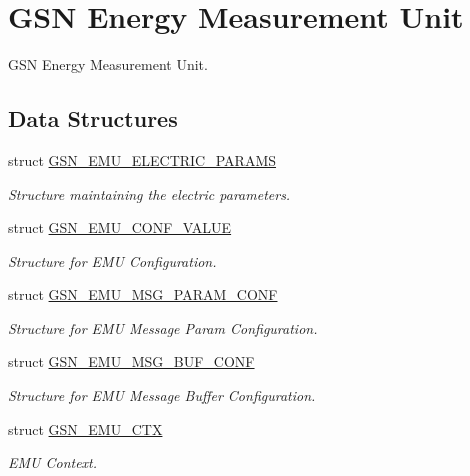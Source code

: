\hypertarget{a00663}{
\section{GSN Energy Measurement Unit}
\label{a00663}
}


GSN Energy Measurement Unit.  


\subsection*{Data Structures}
\begin{DoxyCompactItemize}
\item 
struct \hyperlink{a00060}{GSN\_\-EMU\_\-ELECTRIC\_\-PARAMS}
\begin{DoxyCompactList}\small\item\em Structure maintaining the electric parameters. \end{DoxyCompactList}\item 
struct \hyperlink{a00058}{GSN\_\-EMU\_\-CONF\_\-VALUE}
\begin{DoxyCompactList}\small\item\em Structure for EMU Configuration. \end{DoxyCompactList}\item 
struct \hyperlink{a00064}{GSN\_\-EMU\_\-MSG\_\-PARAM\_\-CONF}
\begin{DoxyCompactList}\small\item\em Structure for EMU Message Param Configuration. \end{DoxyCompactList}\item 
struct \hyperlink{a00063}{GSN\_\-EMU\_\-MSG\_\-BUF\_\-CONF}
\begin{DoxyCompactList}\small\item\em Structure for EMU Message Buffer Configuration. \end{DoxyCompactList}\item 
struct \hyperlink{a00059}{GSN\_\-EMU\_\-CTX}
\begin{DoxyCompactList}\small\item\em EMU Context. \end{DoxyCompactList}\end{DoxyCompactItemize}
